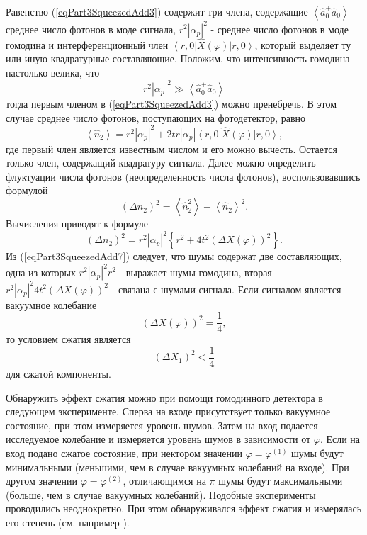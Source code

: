 Равенство (\ref{eqPart3SqueezedAdd3}) содержит три члена, содержащие 
$\left<\hat{a}_0^{+}\hat{a}_0\right>$ - среднее число фотонов в моде
сигнала, $r^2\left|\alpha_p\right|^2$ - среднее число фотонов в моде
гомодина и интерференционный член 
$\left<r, 0\right|\hat{X}\left(\varphi\right)\left|r, 0\right>$,
который выделяет ту или иную квадратурные составляющие. Положим, что
интенсивность гомодина настолько велика, что 
\[
r^2 \left|\alpha_p\right|^2 \gg 
\left<\hat{a}_0^{+}\hat{a}_0\right>
\]
тогда первым членом в (\ref{eqPart3SqueezedAdd3}) можно пренебречь. В
этом случае среднее число фотонов, поступающих на фотодетектор, равно
\begin{equation}
\left<\hat{n}_2\right> = 
r^2 \left|\alpha_p\right|^2 + 2 t r \left|\alpha_p\right|
\left<r, 0\right|\hat{X}\left(\varphi\right)\left|r, 0\right>,
\nonumber
\end{equation}
где первый член является известным числом и его можно
вычесть. Остается только член, содержащий квадратуру сигнала. Далее
можно определить флуктуации числа фотонов (неопределенность числа
фотонов), воспользовавшись формулой
\begin{equation}
\left(\Delta n_2\right)^2 = 
\left<\hat{n}_2^2\right>
-
\left<\hat{n}_2\right>^2.
\nonumber
\end{equation}
Вычисления приводят к формуле
\begin{equation}
\left(\Delta n_2\right)^2 =
r^2 \left|\alpha_p\right|^2
\left\{
r^2 + 4 t^2 
\left(
\Delta X \left(\varphi\right)
\right)^2
\right\}.
\label{eqPart3SqueezedAdd7}
\end{equation}
Из (\ref{eqPart3SqueezedAdd7}) следует, что шумы содержат две
составляющих, одна из которых $r^2 \left|\alpha_p\right|^2 r^2$ -
выражает шумы гомодина, вторая 
$r^2 \left|\alpha_p\right|^2 4 t^2 
\left(
\Delta X \left(\varphi\right)
\right)^2$ -  связана с шумами сигнала. Если сигналом является вакуумное
колебание 
\[
\left(\Delta X \left(\varphi\right)\right)^2  = \frac{1}{4},
\] 
то условием сжатия является 
\[
\left(\Delta X_1 \right)^2 < \frac{1}{4}
\]
для сжатой компоненты. 

Обнаружить эффект сжатия можно при помощи
гомодинного детектора в следующем эксперименте. Сперва на входе
присутствует только вакуумное состояние, при этом измеряется уровень
шумов. Затем на вход подается исследуемое колебание и измеряется
уровень шумов в зависимости от $\varphi$. Если на вход подано сжатое
состояние, при нектором значении $\varphi = \varphi^{(1)}$ шумы будут
минимальными (меньшими, чем в случае вакуумных колебаний на входе). При
другом значении $\varphi = \varphi^{(2)}$, отличающимся на $\pi$ шумы
будут максимальными (больше, чем в случае вакуумных
колебаний). Подобные эксперименты проводились неоднократно. При этом
обнаруживался эффект сжатия и измерялась его степень (см. например
\cite{bNonclassSqueezedStateDetection}). 

